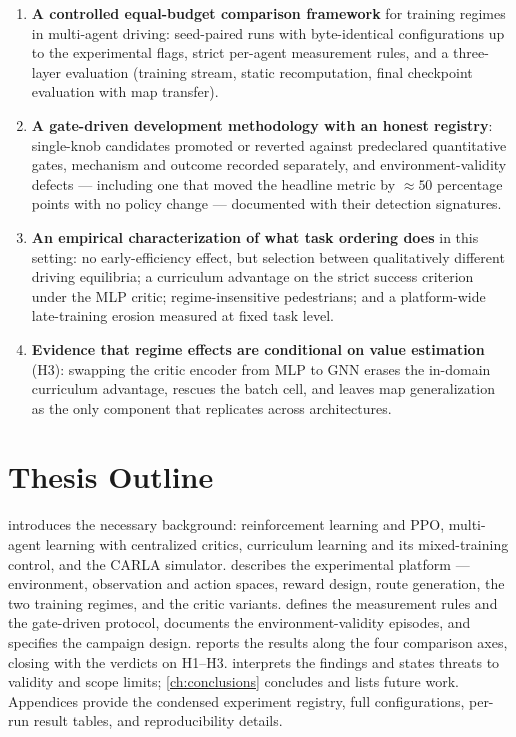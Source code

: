 \begin{enumerate}
  \item \textbf{A controlled equal-budget comparison framework} for
        training regimes in multi-agent driving: seed-paired runs with
        byte-identical configurations up to the experimental flags,
        strict per-agent measurement rules, and a three-layer
        evaluation (training stream, static recomputation, final
        checkpoint evaluation with map transfer).
  \item \textbf{A gate-driven development methodology with an honest
        registry}: single-knob candidates promoted or reverted against
        predeclared quantitative gates, mechanism and outcome recorded
        separately, and environment-validity defects --- including one
        that moved the headline metric by $\approx 50$ percentage
        points with no policy change --- documented with their
        detection signatures.
  \item \textbf{An empirical characterization of what task ordering
        does} in this setting: no early-efficiency effect, but
        selection between qualitatively different driving equilibria;
        a curriculum advantage on the strict success criterion under
        the MLP critic; regime-insensitive pedestrians; and a
        platform-wide late-training erosion measured at fixed task
        level.
  \item \textbf{Evidence that regime effects are conditional on value
        estimation} (H3): swapping the critic encoder from MLP to GNN
        erases the in-domain curriculum advantage, rescues the batch
        cell, and leaves map generalization as the only component that
        replicates across architectures.
\end{enumerate}

\section{Thesis Outline}
\label{sec:outline}

 introduces the necessary background: reinforcement
learning and PPO, multi-agent learning with centralized critics,
curriculum learning and its mixed-training control, and the CARLA
simulator.  describes the experimental platform ---
environment, observation and action spaces, reward design, route
generation, the two training regimes, and the critic variants.
 defines the measurement rules and the gate-driven
protocol, documents the environment-validity episodes, and specifies
the campaign design.  reports the results along the
four comparison axes, closing with the verdicts on H1--H3.
 interprets the findings and states threats to
validity and scope limits; \cref{ch:conclusions} concludes and lists
future work. Appendices provide the condensed experiment registry, full
configurations, per-run result tables, and reproducibility details.
